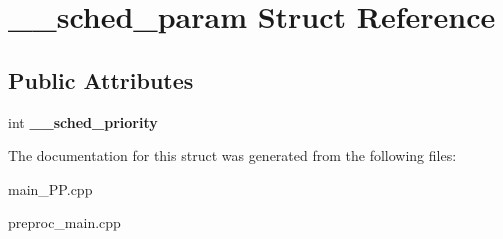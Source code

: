 \hypertarget{struct____sched__param}{\section{\+\_\+\+\_\+sched\+\_\+param Struct Reference}
\label{struct____sched__param}
}
\subsection*{Public Attributes}
\begin{DoxyCompactItemize}
\item 
\hypertarget{struct____sched__param_a9f6bbc7b12e556b4b65b5db54f3b15fe}{int {\bfseries \+\_\+\+\_\+sched\+\_\+priority}}\label{struct____sched__param_a9f6bbc7b12e556b4b65b5db54f3b15fe}

\end{DoxyCompactItemize}


The documentation for this struct was generated from the following files\+:\begin{DoxyCompactItemize}
\item 
main\+\_\+\+P\+P.\+cpp\item 
preproc\+\_\+main.\+cpp\end{DoxyCompactItemize}
